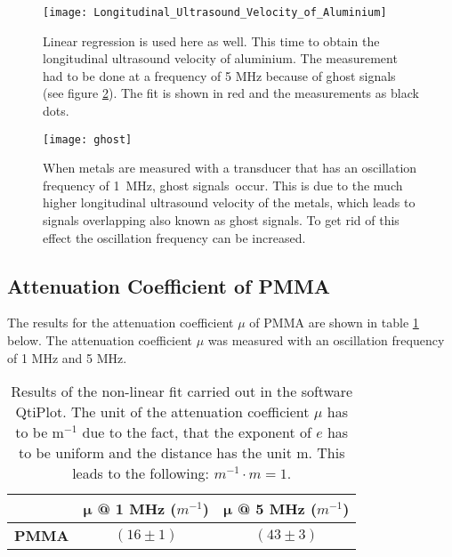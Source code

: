 \begin{figure}[H]
	\centering
	\texttt{[image: Longitudinal\_Ultrasound\_Velocity\_of\_Aluminium]}
	\caption{Linear regression is used here as well. This time to obtain the longitudinal ultrasound velocity of aluminium. The measurement had to be done at a frequency of 5 MHz because of ghost signals (see figure \ref{fig:ghost}). The fit is shown in red and the measurements as black dots.}
	\label{fig:Longitudinal_Ultrasound_Velocity_of_Aluminium}
\end{figure}

\begin{figure}[H]
	\centering
	\texttt{[image: ghost]}
	\caption{When metals are measured with a transducer that has an oscillation frequency of 1~MHz, \flqq ghost signals\frqq\ occur. This is due to the much higher longitudinal ultrasound velocity of the metals, which leads to signals overlapping also known as \flqq ghost signals\frqq. To get rid of this effect the oscillation frequency can be increased.}
	\label{fig:ghost}
\end{figure}

\newpage
\subsection{Attenuation Coefficient of PMMA}
\label{subsec:Attenuation_Coefficient_of_PMMA}
The results for the attenuation coefficient $\mu$ of PMMA are shown in table \ref{tab:Attenuation_Coefficient_of_PMMA} below. The attenuation coefficient $\mu$ was measured with an oscillation frequency of 1 MHz and 5 MHz.

\begin{table}[H]
	\centering
	\renewcommand{\arraystretch}{1.3}
	\begin{tabular}{r||c|c}
		& $\boldsymbol{\mu}$ \textbf{@ 1 MHz} ($m^{-1}$) & $\boldsymbol{\mu}$ \textbf{@ 5 MHz} ($m^{-1}$) \\
		\hline\hline
		\textbf{PMMA} & $(16\pm 1)$ & $(43\pm 3)$ \\
	\end{tabular}
	\caption{Results of the non-linear fit carried out in the software QtiPlot. The unit of the attenuation coefficient $\mu$ has to be m$^{-1}$ due to the fact, that the exponent of $e$ has to be uniform and the distance has the unit m. This leads to the following: $\si{m}^{-1}\cdot \si{m} = 1$.}
	\label{tab:Attenuation_Coefficient_of_PMMA}
\end{table}


